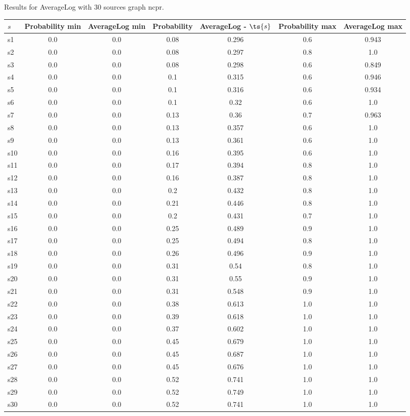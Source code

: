 \documentclass{article}
\begin{document}
\noindent Results for AverageLog with 30 sources graph ncpr.

\noindent\begin{tabular}{|l|c|c|c|c|c|c|}
\hline
$s$& Probability min & AverageLog min & Probability & AverageLog - $\ts{s}$ & Probability max & AverageLog max\\
\hline
s1 &0.0 & 0.0 & 0.08 & 0.296 & 0.6 & 0.943\\
\hline
s2 &0.0 & 0.0 & 0.08 & 0.297 & 0.8 & 1.0\\
\hline
s3 &0.0 & 0.0 & 0.08 & 0.298 & 0.6 & 0.849\\
\hline
s4 &0.0 & 0.0 & 0.1 & 0.315 & 0.6 & 0.946\\
\hline
s5 &0.0 & 0.0 & 0.1 & 0.316 & 0.6 & 0.934\\
\hline
s6 &0.0 & 0.0 & 0.1 & 0.32 & 0.6 & 1.0\\
\hline
s7 &0.0 & 0.0 & 0.13 & 0.36 & 0.7 & 0.963\\
\hline
s8 &0.0 & 0.0 & 0.13 & 0.357 & 0.6 & 1.0\\
\hline
s9 &0.0 & 0.0 & 0.13 & 0.361 & 0.6 & 1.0\\
\hline
s10 &0.0 & 0.0 & 0.16 & 0.395 & 0.6 & 1.0\\
\hline
s11 &0.0 & 0.0 & 0.17 & 0.394 & 0.8 & 1.0\\
\hline
s12 &0.0 & 0.0 & 0.16 & 0.387 & 0.8 & 1.0\\
\hline
s13 &0.0 & 0.0 & 0.2 & 0.432 & 0.8 & 1.0\\
\hline
s14 &0.0 & 0.0 & 0.21 & 0.446 & 0.8 & 1.0\\
\hline
s15 &0.0 & 0.0 & 0.2 & 0.431 & 0.7 & 1.0\\
\hline
s16 &0.0 & 0.0 & 0.25 & 0.489 & 0.9 & 1.0\\
\hline
s17 &0.0 & 0.0 & 0.25 & 0.494 & 0.8 & 1.0\\
\hline
s18 &0.0 & 0.0 & 0.26 & 0.496 & 0.9 & 1.0\\
\hline
s19 &0.0 & 0.0 & 0.31 & 0.54 & 0.8 & 1.0\\
\hline
s20 &0.0 & 0.0 & 0.31 & 0.55 & 0.9 & 1.0\\
\hline
s21 &0.0 & 0.0 & 0.31 & 0.548 & 0.9 & 1.0\\
\hline
s22 &0.0 & 0.0 & 0.38 & 0.613 & 1.0 & 1.0\\
\hline
s23 &0.0 & 0.0 & 0.39 & 0.618 & 1.0 & 1.0\\
\hline
s24 &0.0 & 0.0 & 0.37 & 0.602 & 1.0 & 1.0\\
\hline
s25 &0.0 & 0.0 & 0.45 & 0.679 & 1.0 & 1.0\\
\hline
s26 &0.0 & 0.0 & 0.45 & 0.687 & 1.0 & 1.0\\
\hline
s27 &0.0 & 0.0 & 0.45 & 0.676 & 1.0 & 1.0\\
\hline
s28 &0.0 & 0.0 & 0.52 & 0.741 & 1.0 & 1.0\\
\hline
s29 &0.0 & 0.0 & 0.52 & 0.749 & 1.0 & 1.0\\
\hline
s30 &0.0 & 0.0 & 0.52 & 0.741 & 1.0 & 1.0\\
\hline
\end{tabular}\\
\end{document}
